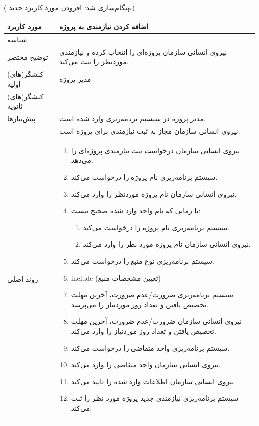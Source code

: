 \newpage
({\color{red} بهنگام‌سازی شد: افزودن مورد کاربرد جدید})
\begin{table}[H]
	\centering
	\begin{tabular}{|p{3cm}|p{10cm}|}
		\hline
		
		
		مورد کاربرد	& اضافه کردن نیازمندی به پروژه  \\
		\hline
		
		شناسه & 
		\stepcounter{usecase_ID}
		
		\arabic{usecase_ID} \\
		
		\hline
		
		توضیح مختصر & نیروی انسانی سازمان پروژه‌ای را انتخاب کرده و نیازمندی موردنظر را ثبت می‌کند. \\
		\hline
		
		کنشگر(های) اولیه& مدیر پروژه \\
		\hline
		
		کنشگر(های) ثانویه&  \\
		\hline
		
		پیش‌نیازها
		& مدیر پروژه در سیستم برنامه‌ریزی وارد شده است.\\
		& نیروی انسانی سازمان مجاز به ثبت نیازمندی برای پروژه است.	\\
		\hline
		
		
		روند اصلی &
		\begin{enumerate}[topsep=0cm,leftmargin=0.5cm]
			\item نیروی انسانی سازمان درخواست ثبت نیازمندی پروژه‌ای را می‌دهد.
			\item سیستم برنامه‌ریزی نام پروژه را درخواست می‌کند.
			\item نیروی انسانی سازمان نام پروژه موردنظر را وارد می‌کند.
			\item تا زمانی که نام واحد وارد شده صحیح نیست: 
			\begin{enumerate}[topsep=0cm,leftmargin=0.5cm]
				\item سیستم برنامه‌ریزی نام پروژه را درخواست می‌کند. 
				\item نیروی انسانی سازمان نام پروژه مورد نظر را وارد می‌کند. 
			\end{enumerate}
			\item سیستم برنامه‌ریزی نوع منبع را درخواست می‌کند.
			\item include (تعیین مشخصات منبع)
			\item سیستم برنامه‌ریزی ضرورت/عدم ضرورت، آخرین مهلت تخصیص یافتن و تعداد روز موردنیاز را می‌پرسد.
			\item نیروی انسانی سازمان ضرورت/عدم ضرورت، آخرین مهلت تخصیص یافتن و تعداد روز موردنیاز را وارد می‌کند.
			\item سیستم برنامه‌ریزی واحد متقاضی را درخواست می‌کند.
			\item نیروی انسانی سازمان واحد متقاضی را وارد می‌کند.
			\item نیروی انسانی سازمان اطلاعات وارد شده را تایید می‌کند.
			\item سیستم برنامه‌ریزی نیازمندی جدید پروژه مورد نظر را ثبت می‌کند.
		\end{enumerate} \\
		

\end{tabular}
\end{table}

